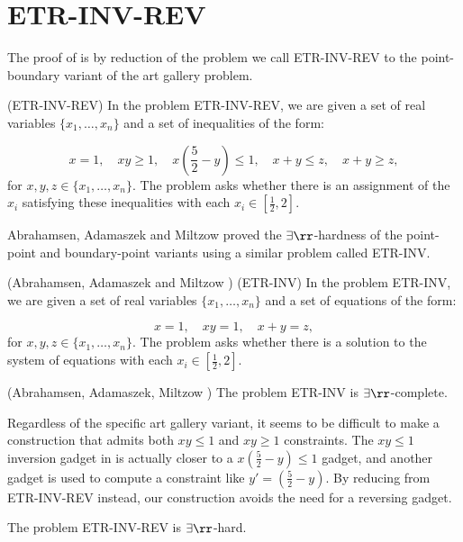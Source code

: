 \section{ETR-INV-REV}\label{sec:ETR_INV_REV}

The proof of  is by reduction of the problem we call ETR-INV-REV to the point-boundary variant of the art gallery problem.

\begin{definition}
(ETR-INV-REV) In the problem ETR-INV-REV, we are given a set of real variables $\{x_1, \dots, x_n\}$ and a set of inequalities of the form:

\[x=1,\quad xy\ge 1,\quad x\left(\frac52-y\right)\le 1,\quad x+y\le z,\quad x+y\ge z,\]
for $x, y, z\in \{x_1,\dots, x_n\}$. The problem asks whether there is an assignment of the $x_i$ satisfying these inequalities with each $x_i\in[\frac12, 2]$.
\end{definition}
Abrahamsen, Adamaszek and Miltzow \cite{ExistsRHardness} proved the $\exists\rr$-hardness of the point-point and boundary-point variants using a similar problem called ETR-INV.

\begin{definition}(Abrahamsen, Adamaszek and Miltzow \cite{ExistsRHardness})
(ETR-INV) In the problem ETR-INV, we are given a set of real variables $\{x_1, \dots, x_n\}$ and a set of equations of the form:

\[x=1,\quad xy=1,\quad x+y=z,\]
for $x, y, z\in \{x_1,\dots, x_n\}$. The problem asks whether there is a solution to the system of equations with each $x_i\in[\frac12, 2]$.
\end{definition}

\begin{theorem}(Abrahamsen, Adamaszek, Miltzow \cite{ExistsRHardness})
The problem ETR-INV is $\exists\rr$-complete.
\end{theorem}

Regardless of the specific art gallery variant, it seems to be difficult to make a construction that admits both $xy\le 1$ and $xy\ge 1$ constraints. The $xy\le 1$ inversion gadget in \cite{ExistsRHardness} is actually closer to a $x\left(\frac52-y\right)\le 1$ gadget, and another gadget is used to compute a constraint like $y'=\left(\frac52-y\right)$. By reducing from ETR-INV-REV instead, our construction avoids the need for a reversing gadget.

\begin{theorem}\label{ETRRevHardness}
The problem ETR-INV-REV is $\exists\rr$-hard.
\end{theorem}

